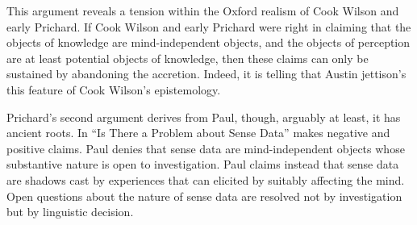 \documentclass[11pt]{article}
\begin{document}
This argument reveals a tension within the Oxford realism of Cook Wilson and early Prichard. If Cook Wilson and early Prichard were right in claiming that the objects of knowledge are mind-independent objects, and the objects of perception are at least potential objects of knowledge, then these claims can only be sustained by abandoning the accretion. Indeed, it is telling that Austin jettison's this feature of Cook Wilson's epistemology.

Prichard's second argument derives from Paul, though, arguably at least, it has ancient roots. %
% 
In ``Is There a Problem about Sense Data'' \cite{Paul:1936kd} makes negative and positive claims. Paul denies that sense data are mind-independent objects whose substantive nature is open to investigation. Paul claims instead that sense data are shadows cast by experiences that can elicited by suitably affecting the mind. Open questions about the nature of sense data are resolved not by investigation but by linguistic decision.
\end{document}
